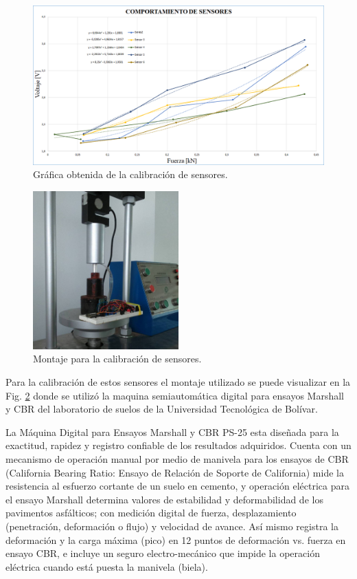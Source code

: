 \begin{figure}[H]
\centering
\includegraphics[width=1\textwidth]{./image/ComportamientoSensores.png}
\caption{Gráfica obtenida de la calibración de sensores.}
\label{fig:Comportamiento}
\end{figure}

\begin{figure}[H]
\centering
\includegraphics[width=0.5\textwidth]{./image/2.jpg}
\caption{Montaje para la calibración de sensores.}
\label{fig:Montaje}
\end{figure}

Para la calibración de estos sensores el montaje utilizado se puede visualizar en la Fig. \ref{fig:Montaje} donde se utilizó la maquina semiautomática digital para ensayos Marshall y CBR del laboratorio de suelos de la Universidad Tecnológica de Bolívar.

La Máquina Digital para Ensayos Marshall y CBR PS-25 esta diseñada para la exactitud, rapidez y registro confiable de los resultados adquiridos. Cuenta con un mecanismo de operación manual por medio de manivela para los ensayos de CBR (California Bearing Ratio: Ensayo de Relación de Soporte de California) mide la resistencia al esfuerzo cortante de un suelo en cemento, y operación eléctrica para el ensayo Marshall determina valores de estabilidad y deformabilidad de los pavimentos asfálticos; con medición digital de fuerza, desplazamiento (penetración, deformación o flujo) y velocidad de avance. Así mismo registra la deformación y la carga máxima (pico) en 12 puntos de deformación vs. fuerza en ensayo CBR, e incluye un seguro electro-mecánico que impide la operación eléctrica cuando está puesta la manivela (biela).

